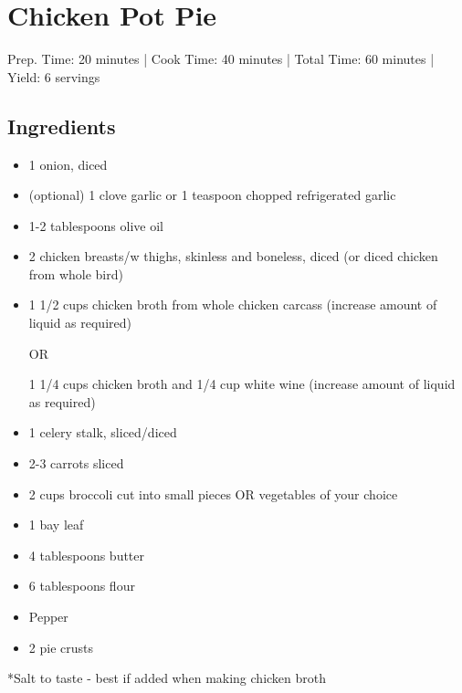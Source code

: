 \section{Chicken Pot Pie}

\begin{center}
Prep. Time: 20 minutes |
Cook Time: 40 minutes | 
Total Time: 60 minutes | 
Yield: 6 servings
\end{center}

\subsection{Ingredients}
\begin{multicols}{2}
\begin{itemize}
    \item 1 onion, diced
    \item (optional) 1 clove garlic or 1 teaspoon chopped refrigerated garlic 
    \item 1-2 tablespoons olive oil
    \item 2 chicken breasts/w thighs, skinless and boneless, diced (or diced chicken from whole bird)
    \item 1 1/2 cups chicken broth from whole chicken carcass
          (increase amount of liquid as required)\par
          OR \par
          1 1/4 cups chicken broth and 1/4 cup white wine (increase amount of liquid as required)
    \item 1 celery stalk, sliced/diced
    \item 2-3 carrots sliced
    \item 2 cups broccoli cut into small pieces OR vegetables of your choice
    \item 1 bay leaf
    \item 4 tablespoons butter
    \item 6 tablespoons flour
    \item Pepper
    \item 2 pie crusts
\end{itemize}
\end{multicols}
*Salt to taste - best if added when making chicken broth 

